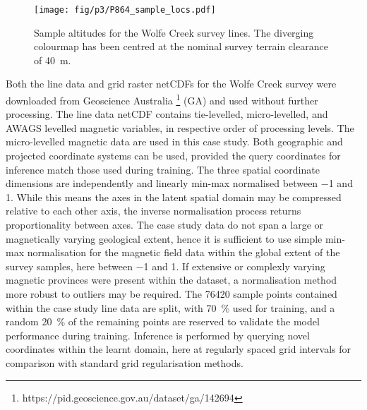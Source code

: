 \documentclass[manuscript.tex]{subfiles}
\begin{document}
\begin{figure}[hbt]
    \centering{}
    \texttt{[image: fig/p3/P864\_sample\_locs.pdf]}
    \caption[Point samples]{Sample altitudes for the Wolfe Creek survey lines. The diverging colourmap has been centred at the nominal survey terrain clearance of \SI{40}{\m}.}
    \label{fig:samples}
\end{figure}

Both the line data and grid raster netCDFs for the Wolfe Creek survey were downloaded from Geoscience Australia \footnote{https://pid.geoscience.gov.au/dataset/ga/142694} (GA) and used without further processing.
The line data netCDF contains tie-levelled, micro-levelled, and AWAGS levelled magnetic variables, in respective order of processing levels.
The micro-levelled magnetic data are used in this case study. %
Both geographic and projected coordinate systems can be used, provided the query coordinates for inference match those used during training.
The three spatial coordinate dimensions are independently and linearly min-max normalised between \num{-1} and \num{1}.
While this means the axes in the latent spatial domain may be compressed relative to each other axis, the inverse normalisation process returns proportionality between axes.
The case study data do not span a large or magnetically varying geological extent, hence it is sufficient to use simple min-max normalisation for the magnetic field data within the global extent of the survey samples, here between \num{-1} and \num{1}.
If extensive or complexly varying magnetic provinces were present within the dataset, a normalisation method more robust to outliers may be required.
The \num{76420} sample points contained within the case study line data are split, with \qty{70}{\percent} used for training, and a random \qty{20}{\percent} of the remaining points are reserved to validate the model performance during training.
Inference is performed by querying novel coordinates within the learnt domain, here at regularly spaced grid intervals for comparison with standard grid regularisation methods.
\end{document}
